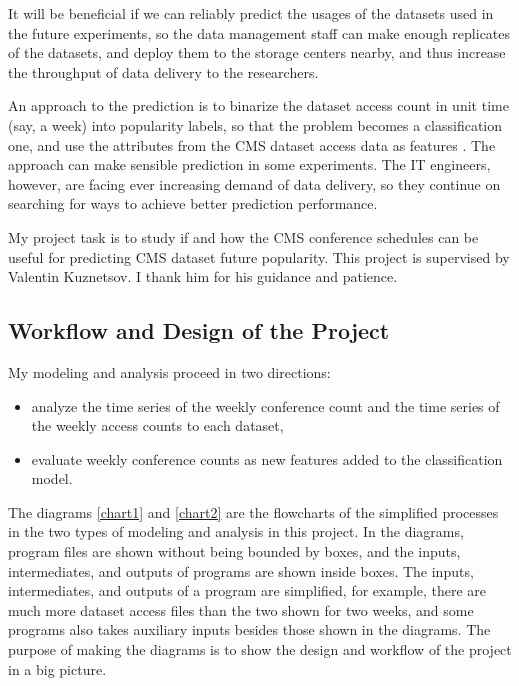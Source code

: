 \documentclass[preprint, 12pt]{elsarticle}
\begin{document}
It will be beneficial if we can reliably predict the usages of the datasets used in the future experiments, so the data management staff can make enough replicates of the datasets, and deploy them to the storage centers nearby, and thus increase the throughput of data delivery to the researchers. 

An approach to the prediction is to binarize the dataset access count in unit time (say, a week) into popularity labels, so that the problem becomes a classification one, and use the attributes from the CMS dataset access data as features \cite{web:vk}.
The approach can make sensible prediction in some experiments.
The IT engineers, however, are facing ever increasing demand of data delivery, so they continue on searching for ways to achieve better prediction performance.

My project task is to study if and how the CMS conference schedules can be useful for predicting CMS dataset future popularity.
This project is supervised by Valentin Kuznetsov. I thank him for his guidance and patience.


\subsection{Workflow and Design of the Project}

My modeling and analysis proceed in two directions:
\begin{itemize}
\item analyze the time series of the weekly conference count and the time series of the weekly access counts to each dataset,
\item evaluate weekly conference counts as new features added to the classification model.
\end{itemize}

The diagrams \ref{chart1} and \ref{chart2} are the flowcharts of the simplified processes in the two types of modeling and analysis in this project.
In the diagrams, program files are shown without being bounded by boxes, and the inputs, intermediates, and outputs of programs are shown inside boxes.
The inputs, intermediates, and outputs of a program are simplified, for example, there are much more dataset access files than the two shown for two weeks, and some programs also takes auxiliary inputs besides those shown in the diagrams.
The purpose of making the diagrams is to show the design and workflow of the project in a big picture.



\end{document}
